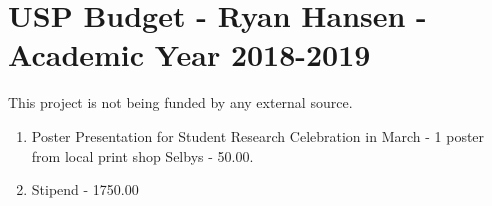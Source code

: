 \documentclass[12pt]{article}
\begin{document}
	
	\section*{USP Budget - Ryan Hansen - Academic Year 2018-2019}
	This project is not being funded by any external source. \\
	\begin{enumerate}
		\item Poster Presentation for Student Research Celebration in March - 1 poster from local print shop Selbys - 50.00.
		\item Stipend - 1750.00
	\end{enumerate}
	 
	
\end{document}
